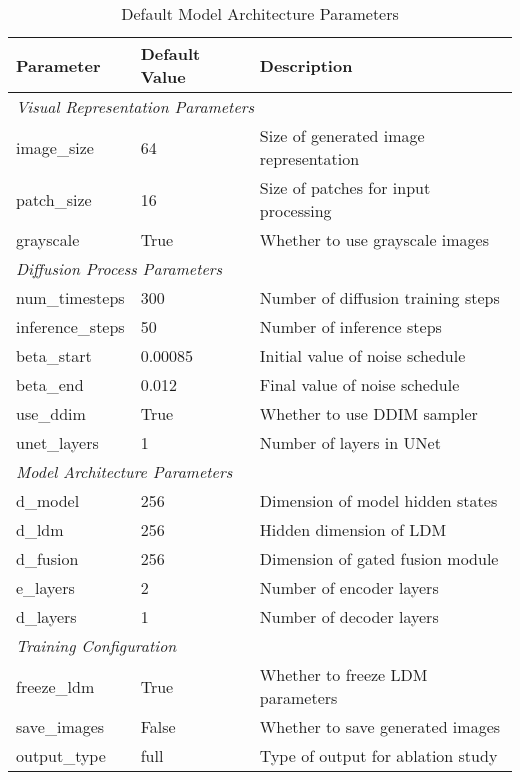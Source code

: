 \begin{table}[htbp]
\centering
\caption{Default Model Architecture Parameters}
\begin{tabular}{|l|l|p{5.5cm}|}
\hline
\textbf{Parameter} & \textbf{Default Value} & \textbf{Description} \\
\hline
\multicolumn{3}{|l|}{\textit{Visual Representation Parameters}} \\
\hline
image\_size & 64 & Size of generated image representation \\
patch\_size & 16 & Size of patches for input processing \\
grayscale & True & Whether to use grayscale images \\
\hline
\multicolumn{3}{|l|}{\textit{Diffusion Process Parameters}} \\
\hline
num\_timesteps & 300 & Number of diffusion training steps \\
inference\_steps & 50 & Number of inference steps \\
beta\_start & 0.00085 & Initial value of noise schedule \\
beta\_end & 0.012 & Final value of noise schedule \\
use\_ddim & True & Whether to use DDIM sampler \\
unet\_layers & 1 & Number of layers in UNet \\
\hline
\multicolumn{3}{|l|}{\textit{Model Architecture Parameters}} \\
\hline
d\_model & 256 & Dimension of model hidden states \\
d\_ldm & 256 & Hidden dimension of LDM \\
d\_fusion & 256 & Dimension of gated fusion module \\
e\_layers & 2 & Number of encoder layers \\
d\_layers & 1 & Number of decoder layers \\
\hline
\multicolumn{3}{|l|}{\textit{Training Configuration}} \\
\hline
freeze\_ldm & True & Whether to freeze LDM parameters \\
save\_images & False & Whether to save generated images \\
output\_type & full & Type of output for ablation study \\
\hline
\end{tabular}
\end{table}